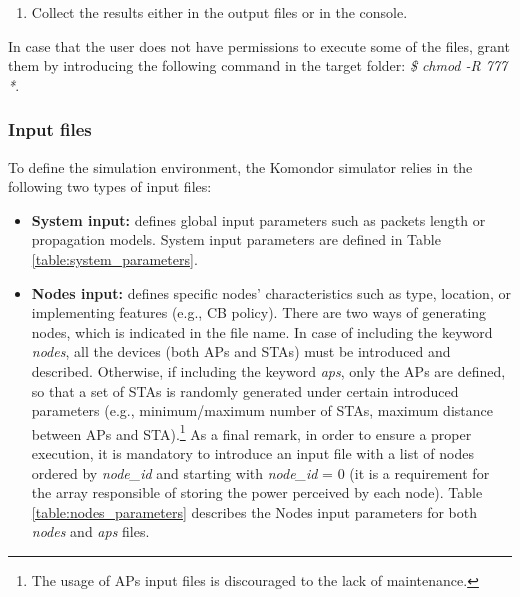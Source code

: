\documentclass[a4paper]{article}
\begin{document}
\begin{enumerate}
\begin{itemize}
		            \item \textit{arg\_6} (FLAG\_PRINT\_SYSTEM\_LOGS): flag to indicate whether to print the system logs (1) or not (0).
		            \item \textit{arg\_7} (FLAG\_PRINT\_NODE\_LOGS): flag to indicate whether to print the nodes logs (1) or not (0).
		            \item \textit{arg\_8} (SIM\_TIME): simulation time in seconds.
		            \item \textit{arg\_8} (SEED): random seed for the experiments.
				\end{itemize}
		    \item Collect the results either in the output files or in the console.
		\end{enumerate}
	
		In case that the user does not have permissions to execute some of the files, grant them by introducing the following command in the target folder: \emph{\$ chmod -R 777 *}.
		
		\subsubsection{Input files}
		\label{section:input_files}	
		To define the simulation environment, the Komondor simulator relies in the following two types of input files:
		\begin{itemize}
			\item \textbf{System input:} defines global input parameters such as packets length or propagation models. System input parameters are defined in Table \ref{table:system_parameters}.
			\item \textbf{Nodes input:} defines specific nodes' characteristics such as type, location, or implementing features (e.g., CB policy). There are two ways of generating nodes, which is indicated in the file name. In case of including the keyword \emph{nodes}, all the devices (both APs and STAs) must be introduced and described. Otherwise, if including the keyword \emph{aps}, only the APs are defined, so that a set of STAs is randomly generated under certain introduced parameters (e.g., minimum/maximum number of STAs, maximum distance between APs and STA).\footnote{The usage of APs input files is discouraged to the lack of maintenance.} As a final remark, in order to ensure a proper execution, it is mandatory to introduce an input file with a list of nodes ordered by \textit{node\_id} and starting with \textit{node\_id} = 0 (it is a requirement for the array responsible of storing the power perceived by each node). Table \ref{table:nodes_parameters} describes the Nodes input parameters for both \emph{nodes} and \emph{aps} files.
		\end{itemize}		
\end{document}
